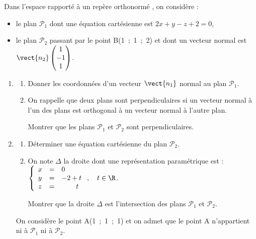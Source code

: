 \medskip

Dans l'espace rapporté à un repère orthonormé \Oijk, on considère :

\begin{itemize}
\item[$\bullet~~$]le plan $\mathcal{P}_1$ dont une équation cartésienne est $2x + y - z +2 = 0$,
\item[$\bullet~~$]le plan $\mathcal{P}_2$ passant par le point B(1~;~1~;~2) et dont un vecteur normal est $\vect{n_2}\begin{pmatrix}1\\-1\\1\end{pmatrix}$.
\end{itemize}

\smallskip

\begin{enumerate}
\item 
	\begin{enumerate}
		\item Donner les coordonnées d'un vecteur $\vect{n_1}$ normal au plan $\mathcal{P}_1$.
		\item On rappelle que deux plans sont perpendiculaires si un vecteur normal à l'un des plans est orthogonal à un vecteur normal à l'autre plan.
		
Montrer que les plans $\mathcal{P}_1$ et $\mathcal{P}_2$ sont perpendiculaires. 
	\end{enumerate}
\item 
	\begin{enumerate}
		\item Déterminer une équation cartésienne du plan $\mathcal{P}_2$.

		\item On note $\Delta$ la droite dont une représentation paramétrique est : $\left\{\begin{array}{l c l}
x&=&0\\y &=& -2 + t\\ z&=&\phantom{2+t}t
\end{array}\right.,\quad t \in  \R$.

Montrer que la droite $\Delta$ est l'intersection des plans $\mathcal{P}_1$ et $\mathcal{P}_2$.
	\end{enumerate}
On considère le point A(1~;~1~;~1) et on admet que le point A n'appartient ni à $\mathcal{P}_1$ ni à $\mathcal{P}_2$.


\end{enumerate}
